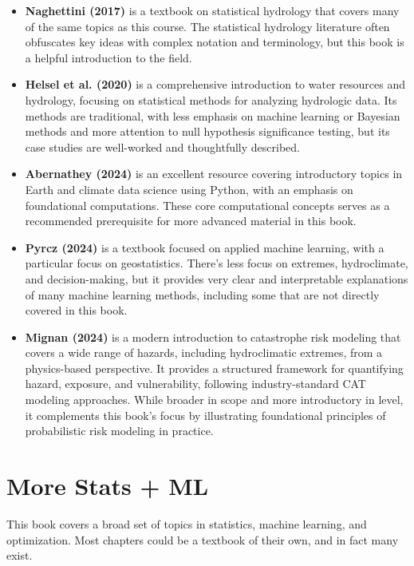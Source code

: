 \documentclass[
  letterpaper,
  DIV=11,
  numbers=noendperiod]{scrreprt}
\providecommand{\tightlist}{%
  \setlength{\itemsep}{0pt}\setlength{\parskip}{0pt}}
\begin{document}
\begin{itemize}
\tightlist
\item
  \textbf{Naghettini (2017)} is a textbook on statistical hydrology that
  covers many of the same topics as this course. The statistical
  hydrology literature often obfuscates key ideas with complex notation
  and terminology, but this book is a helpful introduction to the field.
\item
  \textbf{Helsel et al. (2020)} is a comprehensive introduction to water
  resources and hydrology, focusing on statistical methods for analyzing
  hydrologic data. Its methods are traditional, with less emphasis on
  machine learning or Bayesian methods and more attention to null
  hypothesis significance testing, but its case studies are well-worked
  and thoughtfully described.
\item
  \textbf{Abernathey (2024)} is an excellent resource covering
  introductory topics in Earth and climate data science using Python,
  with an emphasis on foundational computations. These core
  computational concepts serves as a recommended prerequisite for more
  advanced material in this book.
\item
  \textbf{Pyrcz (2024)} is a textbook focused on applied machine
  learning, with a particular focus on geostatistics. There's less focus
  on extremes, hydroclimate, and decision-making, but it provides very
  clear and interpretable explanations of many machine learning methods,
  including some that are not directly covered in this book.
\item
  \textbf{Mignan (2024)} is a modern introduction to catastrophe risk
  modeling that covers a wide range of hazards, including hydroclimatic
  extremes, from a physics-based perspective. It provides a structured
  framework for quantifying hazard, exposure, and vulnerability,
  following industry-standard CAT modeling approaches. While broader in
  scope and more introductory in level, it complements this book's focus
  by illustrating foundational principles of probabilistic risk modeling
  in practice.
\end{itemize}

\section*{More Stats + ML}\label{more-stats-ml}


This book covers a broad set of topics in statistics, machine learning,
and optimization. Most chapters could be a textbook of their own, and in
fact many exist.
\end{document}

